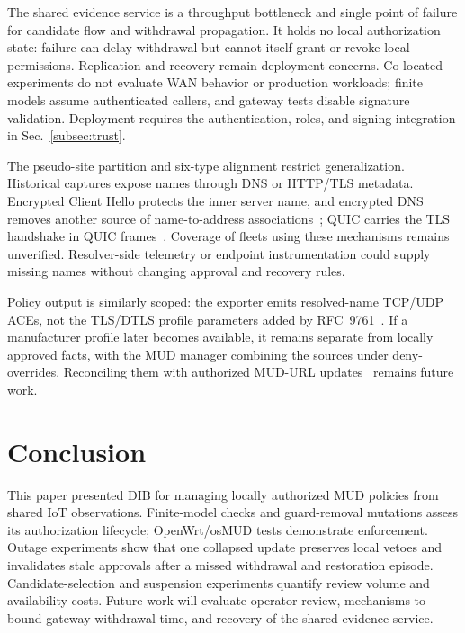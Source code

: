\documentclass[journal]{IEEEtran}
\theoremstyle{definition}
\begin{document}
The shared evidence service is a throughput bottleneck and single point of failure for candidate flow and withdrawal propagation. It holds no local authorization state: failure can delay withdrawal but cannot itself grant or revoke local permissions. Replication and recovery remain deployment concerns. Co-located experiments do not evaluate WAN behavior or production workloads; finite models assume authenticated callers, and gateway tests disable signature validation. Deployment requires the authentication, roles, and signing integration in Sec.~\ref{subsec:trust}.

The pseudo-site partition and six-type alignment restrict generalization. Historical captures expose names through DNS or HTTP/TLS metadata. Encrypted Client Hello protects the inner server name, and encrypted DNS removes another source of name-to-address associations~\cite{rfc9849}; QUIC carries the TLS handshake in QUIC frames~\cite{rfc9001}. Coverage of fleets using these mechanisms remains unverified. Resolver-side telemetry or endpoint instrumentation could supply missing names without changing approval and recovery rules.

Policy output is similarly scoped: the exporter emits resolved-name TCP/UDP ACEs, not the TLS/DTLS profile parameters added by RFC~9761~\cite{rfc9761}. If a manufacturer profile later becomes available, it remains separate from locally approved facts, with the MUD manager combining the sources under deny-overrides. Reconciling them with authorized MUD-URL updates~\cite{mudacceptableurls} remains future work.

\section{Conclusion}
\label{sec:conclusion}
This paper presented DIB for managing locally authorized MUD policies from shared IoT observations. Finite-model checks and guard-removal mutations assess its authorization lifecycle; OpenWrt/osMUD tests demonstrate enforcement. Outage experiments show that one collapsed update preserves local vetoes and invalidates stale approvals after a missed withdrawal and restoration episode. Candidate-selection and suspension experiments quantify review volume and availability costs. Future work will evaluate operator review, mechanisms to bound gateway withdrawal time, and recovery of the shared evidence service.
\end{document}
